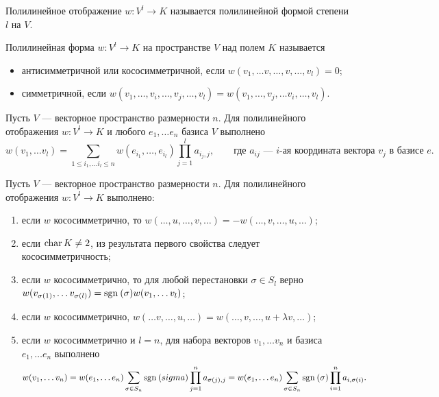 \begin{defn}[Форма]
    Полилинейное отображение $ w \colon V^{l} \to  K$ называется {\sf полилинейной формой степени $ l$ на  $ V$}.  
\end{defn}
\begin{defn}
    Полилинейная форма $ w\colon V^{l} \to  K$ на пространстве $ V$ над полем  $ K$ называется 
    \begin{itemize}[noitemsep]
	\item {\sf антисимметричной}  или {\sf кососимметричной}, если $ w(v_1, \ldots v, \ldots , v, \ldots , v_l) = 0$;
	\item {\sf симметричной}, если $ w(v_1, \ldots , v_i, \ldots , v_j, \ldots , v_l) = w(v_1, \ldots , v_j, \ldots v_i, \ldots , v_l)$.  
    \end{itemize}
\end{defn}
\begin{lm}
    Пусть $ V$ --- векторное пространство размерности $ n$.
    Для полилинейного отображения $ w: V^{l} \to  K$ и любого $ e_1, \ldots e_n$ базиса $ V$ выполнено
    \[
    w(v_1, \ldots v_l) = \sum_{1 \le i_1, \ldots i_l \le n}^{} w(e_{i_1}, \ldots , e_{i_l}) \prod _{j=1}^{l} a_{i_j, j}, \qquad \text{где }  a_{ij} \text{ --- }  i\text{-ая координата вектора } v_j \text{ в базисе } e 
    .\] 
\end{lm}
\begin{lm}
    Пусть  $V$ --- векторное пространство размерности $n$. Для полилинейного отображения $ w\colon V^{l} \to  K$ выполнено:
    \begin{enumerate}[noitemsep]
	\item если $ w$ кососимметрично, то  $ w(\ldots , u, \ldots , v, \ldots ) = - w(\ldots , v, \ldots , u, \ldots )$;
	    \item если $ \operatorname{char} K \ne 2$, из результата первого свойства следует кососимметричность;
	    \item если $ w$ кососимметрично, то для любой перестановки  $ \sigma  \in S_{l} $ верно $ w(v_{\sigma (1)}, \ldots v_{\sigma (l)}) = {\mathop{\text{\rm sgn}}}\: (\sigma ) w(v_1, \ldots v_l)$;
	    \item если $ w$ кососимметрично,  $ w(\ldots v, \ldots , u, \ldots ) = w(\ldots , v, \ldots , u + \lambda v, \ldots )$;
	    \item если $ w $ кососимметрично и $ l  = n$, для набора векторов $ v_1, \ldots v_n$ и базиса $ e_1, \ldots e_n$ выполнено
		\[
		    w(v_1, \ldots v_n) = w(e_1, \ldots e_n) \sum_{\sigma \in S_n}^{} {\mathop{\text{\rm sgn}}}\:(\\sigma ) \prod_{j=1}^{n} a_{\sigma (j), j} = w(e_1, \ldots e_n) \sum_{\sigma \in S_{n} }^{} {\mathop{\text{\rm sgn}}}\:(\sigma ) \prod _{i=1}^{n} a_{i, \sigma (i)}  
		.\] 
    \end{enumerate} 
\end{lm}
% 
